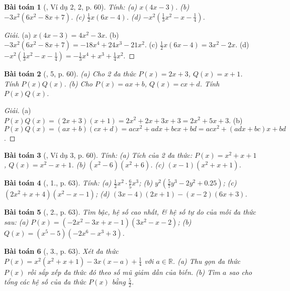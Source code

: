 \documentclass{article}
\newtheorem{baitoan}{Bài toán}
\begin{document}
\begin{baitoan}[\cite{SGK_Toan_7_Canh_Dieu_tap_2}, Ví dụ 2, 2, p. 60]
	Tính: (a) $x(4x - 3)$. (b) $-3x^2(6x^2 - 8x + 7)$. (c) $\frac{1}{2}x(6x - 4)$. (d) $-x^2\left(\frac{1}{3}x^2 - x - \frac{1}{4}\right)$.
\end{baitoan}

\begin{proof}[Giải]
	(a) $x(4x - 3) = 4x^2 - 3x$. (b) $-3x^2(6x^2 - 8x + 7) = -18x^4 + 24x^3 - 21x^2$. (c) $\frac{1}{2}x(6x - 4) = 3x^2 - 2x$. (d) $-x^2\left(\frac{1}{3}x^2 - x - \frac{1}{4}\right) = -\frac{1}{3}x^4 + x^3 + \frac{1}{4}x^2$.
\end{proof}

\begin{baitoan}[\cite{SGK_Toan_7_Canh_Dieu_tap_2}, 5, p. 60]
	(a) Cho 2 đa thức $P(x) = 2x + 3$, $Q(x) = x + 1$. Tính $P(x)Q(x)$. (b) Cho $P(x) = ax + b$, $Q(x) = cx + d$. Tính $P(x)Q(x)$.
\end{baitoan}

\begin{proof}[Giải]
	(a) $P(x)Q(x) = (2x + 3)(x + 1) = 2x^2 + 2x + 3x + 3 = 2x^2 + 5x + 3$. (b) $P(x)Q(x) = (ax + b)(cx + d) = acx^2 + adx + bcx + bd = acx^2 + (adx + bc)x + bd$.
\end{proof}

\begin{baitoan}[\cite{SGK_Toan_7_Canh_Dieu_tap_2}, Ví dụ 3, p. 60]
	Tính: (a) Tích của 2 đa thức: $P(x) = x^2 + x + 1$, $Q(x) = x^2 - x + 1$. (b) $(x^2 - 6)(x^2 + 6)$. (c) $(x - 1)(x^2 + x + 1)$.
\end{baitoan}

\begin{baitoan}[\cite{SGK_Toan_7_Canh_Dieu_tap_2}, 1., p. 63]
	Tính: (a) $\frac{1}{2}x^2\cdot\frac{6}{5}x^3$; (b) $y^2\left(\frac{5}{7}y^3 - 2y^2 + 0.25\right)$; (c) $(2x^2 + x + 4)(x^2 - x - 1)$; (d) $(3x - 4)(2x + 1) - (x - 2)(6x + 3)$.
\end{baitoan}

\begin{baitoan}[\cite{SGK_Toan_7_Canh_Dieu_tap_2}, 2., p. 63]
	Tìm bậc, hệ số cao nhất, \& hệ số tự do của mỗi đa thức sau: (a) $P(x) = (-2x^2 - 3x + x - 1)(3x^2 - x - 2)$; (b) $Q(x) = (x^5 - 5)(-2x^6 - x^3 + 3)$.
\end{baitoan}

\begin{baitoan}[\cite{SGK_Toan_7_Canh_Dieu_tap_2}, 3., p. 63]
	Xét đa thức $P(x) = x^2(x^2 + x + 1) - 3x(x - a) + \frac{1}{4}$ với $a\in\mathbb{R}$. (a) Thu gọn đa thức $P(x)$ rồi sắp xếp đa thức đó theo số mũ giảm dần của biến. (b) Tìm $a$ sao cho tổng các hệ số của đa thức $P(x)$ bằng $\frac{5}{2}$.
\end{baitoan}
\end{document}
